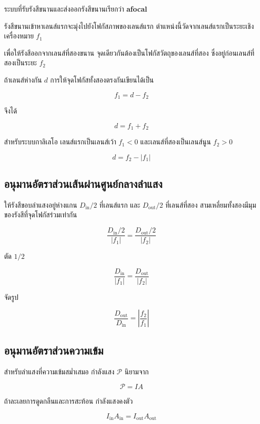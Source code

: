 ระบบที่รับรังสีขนานและส่งออกรังสีขนานเรียกว่า \textbf{afocal}

รังสีขนานเข้าหาเลนส์แรกจะมุ่งไปยังโฟกัสภาพของเลนส์แรก ตำแหน่งนี้วัดจากเลนส์แรกเป็นระยะเชิงเครื่องหมาย $f_1$

เพื่อให้รังสีออกจากเลนส์ที่สองขนาน จุดเดียวกันต้องเป็นโฟกัสวัตถุของเลนส์ที่สอง ซึ่งอยู่ก่อนเลนส์ที่สองเป็นระยะ $f_2$

ถ้าเลนส์ห่างกัน $d$ การให้จุดโฟกัสทั้งสองตรงกันเขียนได้เป็น

\[
f_1=d-f_2
\]

จึงได้

\begin{tcolorbox}[title={ระยะห่างของระบบ afocal}]
\[
\boxed{d=f_1+f_2}
\]
\end{tcolorbox}

สำหรับระบบกาลิเลโอ เลนส์แรกเป็นเลนส์เว้า $f_1<0$ และเลนส์ที่สองเป็นเลนส์นูน $f_2>0$

\[
d=f_2-|f_1|
\]

\subsection{อนุมานอัตราส่วนเส้นผ่านศูนย์กลางลำแสง}

ให้รังสีขอบลำแสงอยู่ห่างแกน $D_{\text{in}}/2$ ที่เลนส์แรก และ $D_{\text{out}}/2$ ที่เลนส์ที่สอง สามเหลี่ยมทั้งสองมีมุมของรังสีที่จุดโฟกัสร่วมเท่ากัน

\[
\frac{D_{\text{in}}/2}{|f_1|}
=
\frac{D_{\text{out}}/2}{|f_2|}
\]

ตัด $1/2$

\[
\frac{D_{\text{in}}}{|f_1|}
=
\frac{D_{\text{out}}}{|f_2|}
\]

จัดรูป

\begin{tcolorbox}[title={อัตราส่วนขนาดลำแสงในระบบ afocal}]
\[
\boxed{
\frac{D_{\text{out}}}{D_{\text{in}}}
=
\left|\frac{f_2}{f_1}\right|}
\]
\end{tcolorbox}

\subsection{อนุมานอัตราส่วนความเข้ม}

สำหรับลำแสงที่ความเข้มสม่ำเสมอ กำลังแสง $\mathcal P$ นิยามจาก

\[
\mathcal P=IA
\]

ถ้าละเลยการดูดกลืนและการสะท้อน กำลังแสงคงตัว

\[
I_{\text{in}}A_{\text{in}}
=
I_{\text{out}}A_{\text{out}}
\]

